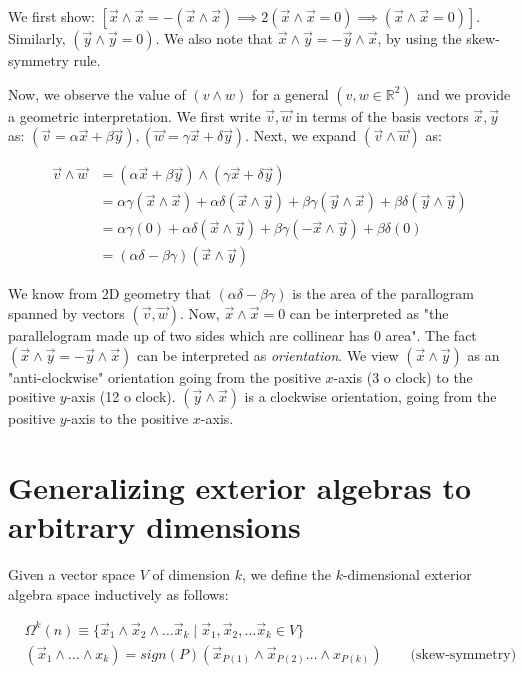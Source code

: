 \documentclass[11pt]{book}
\newcommand{\R}{\ensuremath{\mathbb R}}
\begin{document}
We first show:
$[\vec x \wedge \vec x = - (\vec x \wedge \vec x) \implies 2 (\vec x \wedge \vec x = 0) \implies (\vec x \wedge \vec x = 0)]$.
Similarly, $(\vec y \wedge \vec y= 0)$. We also note that $\vec x \wedge \vec y = - \vec y \wedge \vec x$,
by using the skew-symmetry rule.


Now, we observe the value of $(v \wedge w)$ for a general $(v, w \in \R^2)$ and we
provide a geometric interpretation. We first write $\vec v, \vec w$ in terms
of the basis vectors $\vec x, \vec y$ as:
$(\vec v = \alpha \vec x + \beta \vec y), (\vec w = \gamma \vec x + \delta \vec y)$.
Next, we expand $(\vec v \wedge \vec w)$ as:

\begin{align*}
\vec v \wedge \vec w 
&= (\alpha \vec x + \beta \vec y) \wedge (\gamma \vec x + \delta \vec y) \\
&=       \alpha \gamma (\vec x \wedge \vec x) + 
        \alpha \delta (\vec x \wedge \vec y) + 
        \beta \gamma  (\vec y \wedge \vec x) + 
        \beta \delta  (\vec y \wedge \vec y)  \\
&= \alpha \gamma (0) + 
  \alpha \delta (\vec x \wedge \vec y)  +
  \beta \gamma (- \vec x \wedge \vec y) +
  \beta \delta (0) \\
&= (\alpha \delta - \beta \gamma)(\vec x \wedge \vec y)
\end{align*}

We know from 2D geometry that $(\alpha \delta - \beta \gamma)$ is the area
of the parallogram spanned by vectors $(\vec v, \vec w)$. Now, $\vec x \wedge \vec x = 0$
can be interpreted as "the parallelogram made up of two sides which are collinear has  0 area".
The fact $(\vec x \wedge \vec y = - \vec y \wedge \vec x)$ can be interpreted
as \emph{orientation}. We view $(\vec x \wedge \vec y)$ as an "anti-clockwise" 
orientation going from the positive $x$-axis (3 o clock) to the positive $y$-axis (12 o clock).
$(\vec y \wedge \vec x)$ is a clockwise orientation, going from the positive $y$-axis to
the positive $x$-axis.

\section{Generalizing exterior algebras to arbitrary dimensions}
Given a vector space $V$ of dimension $k$, we define the $k$-dimensional
exterior algebra space inductively as follows:

\begin{align*}
    &\Omega^k(n) \equiv \{ \vec x_1 \wedge \vec x_2 \wedge \dots \vec x_k \mid 
            \vec x_1, \vec x_2, \dots \vec x_k \in V \} \\
    & (\vec x_1 \wedge \dots \wedge x_k) = 
    sign(P)
    (\vec x_{P(1)} \wedge \vec x_{P(2)} \dots \wedge x_{P(k)})
    \qquad \text{(skew-symmetry)} \\
\end{align*}
\end{document}
